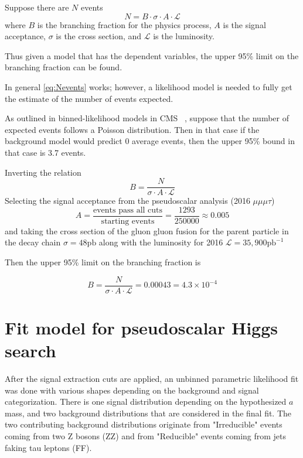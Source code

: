 Suppose there are $N$ events 
\begin{equation}
\label{eq:Nevents}
N = B\cdot \sigma \cdot A\cdot \mathcal{L}
\end{equation}
where $B$ is the branching fraction for the physics process, $A$ is the signal acceptance, $\sigma$ is the cross section, and $\mathcal{L}$ is the luminosity.

Thus given a model that has the dependent variables, the upper 95\% limit on the branching fraction can be found. 

In general \ref{eq:Nevents} works; however, a likelihood model is needed to fully get the estimate of the number of events expected. 

As outlined in binned-likelihood models in CMS ~\cite{Cowan_2011}, suppose that the number of expected events follows a Poisson distribution. Then in that case if the background model would predict 0 average events, then the upper 95\% bound in that case is 3.7 events. 

Inverting the relation
\[B = \frac{N}{\sigma \cdot A\cdot \mathcal{L}}\]
Selecting the signal acceptance from the pseudoscalar analysis (2016 $\mu\mu\mu\tau$) 
\[ A = \frac{\text{events pass all cuts}}{\text{starting events}} = \frac{1293}{250000} \approx 0.005 \]
and taking the cross section of the gluon gluon fusion for the parent particle in the decay chain $\sigma = 48 \text{pb}$ along with the luminosity for 2016 $\mathcal{L} = 35,900 \text{pb}^{-1}$

Then the upper 95\% limit on the branching fraction is 

\[B =  \frac{N}{\sigma \cdot A\cdot \mathcal{L}} = 0.00043 = 4.3 \times 10^{-4}\]



\section{Fit model for pseudoscalar Higgs search}
After the signal extraction cuts are applied, an unbinned parametric likelihood fit was done with various shapes depending on the background and signal categorization. There is one signal distribution depending on the hypothesized $a$ mass, and two background distributions that are considered in the final fit. The two contributing background distributions originate from "Irreducible" events coming from two Z bosons (ZZ) and from "Reducible" events coming from jets faking tau leptons (FF).  


